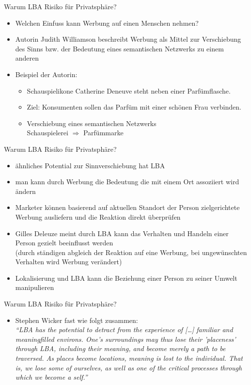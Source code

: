 \begin{frame}{Warum LBA Risiko für Privatsphäre?}
 \begin{itemize}
   \item Welchen Einfuss kann Werbung auf einen Menschen nehmen?
   \item Autorin Judith Williamson beschreibt Werbung als Mittel zur Verschiebung des Sinns bzw. der Bedeutung eines semantischen Netzwerks zu einem anderen
   \item Beispiel der Autorin:
   \begin{itemize}
     \item Schauspielikone Catherine Deneuve steht neben einer Parfümflasche.
     \item Ziel: Konsumenten sollen das Parfüm mit einer schönen Frau verbinden.
     \item Verschiebung eines semantischen Netzwerks\\
     Schauspielerei $\Rightarrow$ Parfümmarke
   \end{itemize}
 \end{itemize}
\end{frame}

\begin{frame}{Warum LBA Risiko für Privatsphäre?}
 \begin{itemize}
   \item ähnliches Potential zur Sinnverschiebung hat LBA
   \item man kann durch Werbung die Bedeutung die mit einem Ort assoziiert wird ändern
   \item Marketer können basierend auf aktuellen Standort der Person zielgerichtete Werbung ausliefern und die Reaktion direkt überprüfen
   \item Gilles Deleuze meint durch LBA kann das Verhalten und Handeln einer Person gezielt beeinflusst werden\\
   (durch ständigen abgleich der Reaktion auf eine Werbung, bei ungewünschten Verhalten wird Werbung verändert)
   \item Lokalisierung und LBA kann die Beziehung einer Person zu seiner Umwelt manipulieren
 \end{itemize}
\end{frame}

\begin{frame}{Warum LBA Risiko für Privatsphäre?}
 \begin{itemize}
   \item Stephen Wicker fast wie folgt zusammen:\\ \vspace{.5cm}
   \textit{"`LBA has the potential to detract from the experience of [\dots] familiar and meaningfilled environs. One’s surroundings may thus lose their ’placeness’ through LBA, including their meaning, and become merely a path to be traversed. As places become locations, meaning is lost to the individual. That is, we lose some of ourselves, as well as one of the critical processes through which we become a self."'}
 \end{itemize}
\end{frame}

